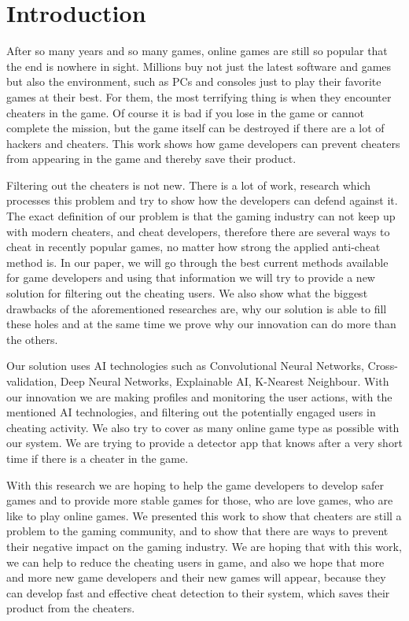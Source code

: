 \section{Introduction}
\label{ch:intro}

After so many years and so many games, online games are still so popular that the end is nowhere in sight.
Millions buy not just the latest software and games but also the environment, such as PCs and consoles just to play their favorite games at their best.
For them, the most terrifying thing is when they encounter cheaters in the game.
Of course it is bad if you lose in the game or cannot complete the mission, but the game itself can be destroyed if there are a lot of hackers and cheaters.
This work shows how game developers can prevent cheaters from appearing in the game and thereby save their product.

Filtering out the cheaters is not new. 
There is a lot of work, research which processes this problem and try to show how the developers can defend against it.
The exact definition of our problem is that the gaming industry can not keep up with modern cheaters, and cheat developers, therefore there are several ways to cheat in recently popular games, no matter how strong the applied anti-cheat method is. 
In our paper, we will go through the best current methods available for game developers and using that information we will try to provide a new solution for filtering out the cheating users.
We also show what the biggest drawbacks of the aforementioned researches are, why our solution is able to fill these holes and at the same time we prove why our innovation can do more than the others.

Our solution uses AI technologies such as Convolutional Neural Networks, Cross-validation, Deep Neural Networks, Explainable AI, K-Nearest Neighbour.
With our innovation we are making profiles and monitoring the user actions, with the mentioned AI technologies, and filtering out the potentially engaged users in cheating activity. 
We also try to cover as many online game type as possible with our system. We are trying to provide a detector app that knows after a very short time if there is a cheater in the game.

With this research we are hoping to help the game developers to develop safer games and to provide more stable games for those, who are love games, who are like to play online games.
We presented this work to show that cheaters are still a problem to the gaming community, and to show that there are ways to prevent their negative impact on the gaming industry.
We are hoping that with this work, we can help to reduce the cheating users in game, and also we hope that more and more new game developers and their new games will appear, because they can develop fast and effective cheat detection to their system, which saves their product from the cheaters.

